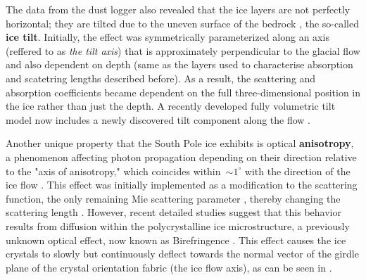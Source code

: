 The data from the dust logger also revealed that the ice layers are not perfectly horizontal; they are tilted due to the uneven surface of the bedrock \cite{dust_logger}, the so-called \textbf{ice tilt}. Initially, the effect was symmetrically parameterized along an axis (reffered to as \emph{the tilt axis}) that is approximately perpendicular to the glacial flow and also dependent on depth (same as the layers used to characterise absorption and scatetring lengths described before)\cite{spicemie}. As a result, the scattering and absorption coefficients became dependent on the full three-dimensional position in the ice rather than just the depth. A recently developed fully volumetric tilt model now includes a newly discovered tilt component along the flow .


Another unique property that the South Pole ice exhibits is optical \textbf{anisotropy}, a phenomenon affecting photon propagation depending on their direction relative to the "axis of anisotropy," which coincides within $\sim 1^\circ$ with the direction of the ice flow \cite{spicemie}. This effect was initially implemented as a modification to the scattering function, the only remaining Mie scattering parameter , thereby changing the scattering length .  However, recent detailed studies suggest that this behavior results from diffusion within the polycrystalline ice microstructure, a previously unknown optical effect, now known as Birefringence . This effect causes the ice crystals to slowly but continuously deflect towards the normal vector of the girdle plane of the crystal orientation fabric (the ice flow axis), as can be seen in .



